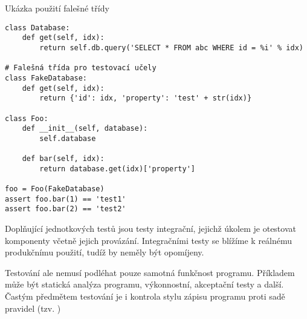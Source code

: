 \begin{listing}[ht]
\caption{\label{code:test-stub}Ukázka použití falešné třídy}
\begin{verbatim}
class Database:
    def get(self, idx):
        return self.db.query('SELECT * FROM abc WHERE id = %i' % idx)

# Falešná třída pro testovací učely
class FakeDatabase:
    def get(self, idx):
        return {'id': idx, 'property': 'test' + str(idx)}

class Foo:
    def __init__(self, database):
        self.database

    def bar(self, idx):
        return database.get(idx)['property']

foo = Foo(FakeDatabase)
assert foo.bar(1) == 'test1'
assert foo.bar(2) == 'test2'
\end{verbatim}
\end{listing}

Doplňující jednotkových testů jsou testy integrační, jejichž úkolem je otestovat komponenty včetně jejich provázání.
Integračními testy se blížíme k reálnému produkčnímu použití, tudíž by neměly být opomíjeny.

Testování ale nemusí podléhat pouze samotná funkčnost programu.
Příkladem může být statická analýza programu, výkonnostní, akceptační testy a další.
Častým předmětem testování je i kontrola stylu zápisu programu proti sadě pravidel (tzv. )

